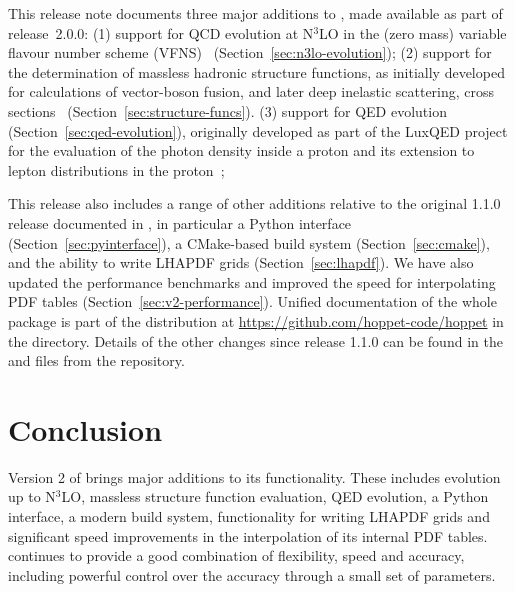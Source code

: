 \documentclass[preprint,1p,a4paper,11pt]{elsarticle}
\begin{document}
This release note documents three major additions to \hoppet, made
available as part of release~2.0.0: 
%
(1) support for QCD evolution at N$^3$LO in the (zero mass) variable
flavour number scheme (VFNS)~\cite{Buza:1996wv} (Section~\ref{sec:n3lo-evolution});
%
(2) support for the
determination of massless hadronic structure functions, as initially developed
for calculations of vector-boson fusion, and later deep inelastic scattering, cross
sections~\cite{Cacciari:2015jma,Dreyer:2016oyx,Dreyer:2018qbw,Dreyer:2018rfu,Karlberg:2024hnl}
(Section~\ref{sec:structure-funcs}).
%
(3) support for QED evolution (Section~\ref{sec:qed-evolution}),
originally developed as part of the LuxQED project for the evaluation
of the photon density inside a proton and its extension to lepton
distributions in the
proton~\cite{Manohar:2016nzj,Manohar:2017eqh,Buonocore:2020nai,Buonocore:2021bsf};

This release also includes a range of other additions relative
to the original 1.1.0 release documented in \cite{Salam:2008qg}, in
particular a Python interface
(Section~\ref{sec:pyinterface}), a CMake-based build system
(Section~\ref{sec:cmake}), and the ability to write LHAPDF grids
(Section~\ref{sec:lhapdf}).
%
We have also updated the performance benchmarks and improved the speed
for interpolating PDF tables (Section~\ref{sec:v2-performance}).
%
Unified documentation of the whole \hoppet package is part of the
distribution at \url{https://github.com/hoppet-code/hoppet} in the
 directory.
%
Details of the other changes since release 1.1.0 can be found in the
 and  files from the
repository.\medskip

\noindent {}



\section{Conclusion}

Version 2 of \hoppet brings major additions to its functionality.
%
These includes evolution up to N$^3$LO, massless structure function
evaluation, QED evolution, a Python interface, a modern build system,
functionality for writing LHAPDF grids and significant speed
improvements in the interpolation of its internal PDF tables.
%
\hoppet continues to provide a good combination of flexibility, speed
and accuracy, including powerful control over the accuracy through a
small set of parameters.
%
\end{document}
